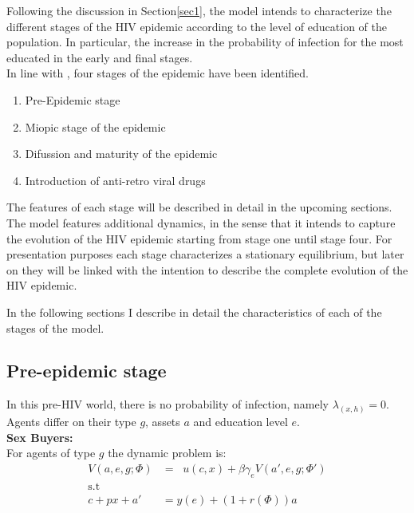 Following the discussion in Section\ref{sec1}, the model intends to characterize the different stages of the HIV epidemic according to the level of education of the population. In particular, the increase in the probability of infection for the most educated in the early and final stages.\\
In line with \cite{raul}, four stages of the epidemic have been identified. 
\begin{enumerate}
\item Pre-Epidemic stage
\item Miopic stage of the epidemic
\item Difussion and maturity of the epidemic
\item Introduction of anti-retro viral drugs
\end{enumerate}
The features of each stage will be described in detail in the upcoming sections.\\

The model features additional dynamics, in the sense that it intends to capture the evolution of the HIV epidemic starting from stage one until stage four. For presentation purposes each stage characterizes a stationary equilibrium, but later on they will be linked with the intention to describe the complete evolution of the HIV epidemic.

In the following sections I describe in detail the characteristics of each of the stages of the model.  
\subsection{Pre-epidemic stage}\label{pre}
In this pre-HIV world, there is no probability of infection, namely $\lambda_(x,h)=0$. Agents differ on their type $g$, assets $a$ and education level $e$.\\

\noindent\textbf{Sex Buyers:}\\
For agents of type $g$ the dynamic problem is:
\begin{align}
V(a,e,g;\Phi) &= \mathop{\max_{c\geq 0,x \geq 0,a' \geq 0}}  u(c,x) + \beta \gamma_{e} V(a',e,g;\Phi') \label{eq1}\\
\mbox{s.t}\nonumber\\
c+ px +a'&= y(e) + (1+r(\Phi))a \label{eq2}
\end{align}

